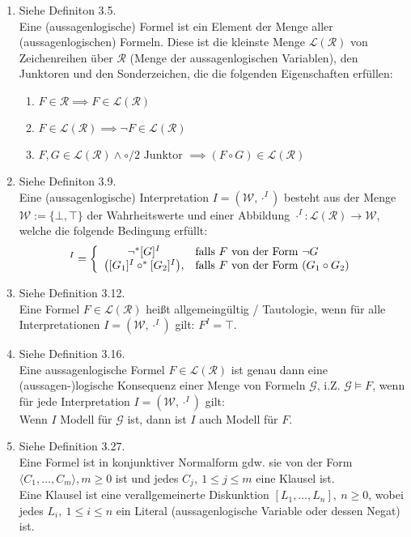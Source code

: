 \documentclass[12pt,a4paper]{article}
\renewcommand{\L}{\mathcal{L}} %
\newcommand{\RR}{\mathcal{R}} %
\newcommand{\G}{\mathcal{G}}
\newcommand{\W}{\mathcal{W}}
\begin{document}
\begin{lösung}
\begin{enumerate}
\item Siehe Definiton 3.5.\\
Eine (aussagenlogische) Formel ist ein Element der Menge aller (aussagenlogischen) Formeln. Diese ist die kleinste Menge $\L(\RR)$ von Zeichenreihen über $\RR$ (Menge der aussagenlogischen Variablen), den Junktoren und den Sonderzeichen, die die folgenden Eigenschaften erfüllen:
\begin{enumerate}
\item $F\in\RR\implies F\in\L(\RR)$
\item $F\in\L(\RR)\implies\neg F\in\L(\RR)$
\item $F,G\in\L(\RR)\wedge\circ/2\text{ Junktor }\implies(F\circ G)\in\L(\RR)$
\end{enumerate}
\item Siehe Definiton 3.9.\\
Eine (aussagenlogische) Interpretation $I=(\W,\cdot^I)$ besteht aus der Menge $\W:=\lbrace\bot,\top\rbrace$ der Wahrheitswerte und einer Abbildung $\cdot^I:\L(\RR)\to\W$, welche die folgende Bedingung erfüllt:
\begin{align*}
[F]^I=\left\lbrace\begin{array}{cl}
\neg^\ast[G]^I & \falls F \text{ von der Form }\neg G\\
\big([G_1]^I\circ^\ast[G_2]^I\big), &\falls F\text{ von der Form }(G_1\circ G_2)
\end{array}\right.
\end{align*}
\item Siehe Definition 3.12.\\
Eine Formel $F\in\L(\RR)$ heißt allgemeingültig / Tautologie, wenn für alle Interpretationen $I=(\W,\cdot^I)$ gilt: $F^I=\top$.
\item Siehe Definition 3.16.\\
Eine aussagenlogische Formel $F\in\L(\RR)$ ist genau dann eine (aussagen-)logische Konsequenz einer Menge von Formeln $\G$, i.Z. $\G\models F$, wenn für jede Interpretation $I=(\W,\cdot^I)$ gilt:\\
Wenn $I$ Modell für $\G$ ist, dann ist $I$ auch Modell für $F$.
\item Siehe Definition 3.27.\\
Eine Formel ist in konjunktiver Normalform gdw. sie von der Form $\langle C_1,\ldots,C_m\rangle,m\geq0$ ist und jedes $C_j,~1\leq j\leq m$ eine Klausel ist.\\
Eine Klausel ist eine verallgemeinerte Diskunktion  $[L_1,\ldots,L_n],~n\geq0$, wobei jedes $L_i,~1\leq i\leq n$ ein Literal (aussagenlogische Variable oder dessen Negat) ist.
\end{enumerate}
\end{lösung}
\end{document}
